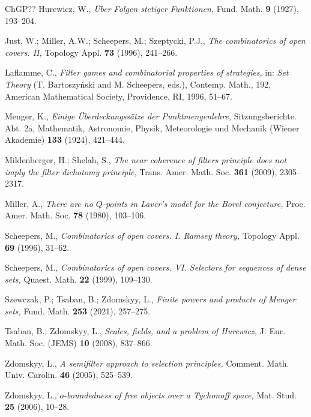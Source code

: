 \documentclass[12pt,a4paper]{amsart}
\theoremstyle{definition}
\begin{document}
\begin{thebibliography}{ChGP??}
 Hurewicz, W.,
{\it \"Uber Folgen stetiger Funktionen,} Fund.  Math. \textbf{9}  (1927), 193--204.

  Just, W.; Miller, A.W.; Scheepers, M.; Szeptycki, P.J.,
{\it The combinatorics of open covers. II,}  Topology Appl.
\textbf{73}  (1996),   241--266.

Laflamme, C., 
{\it Filter games and combinatorial properties of strategies,} 
in: \emph{Set Theory} 
(T. Bartoszy\'nski and M. Scheepers, eds.),
Contemp. Math., 192,
American Mathematical Society, Providence, RI, 1996, 51--67.




Menger, K., {\it Einige \"{U}berdeckungss\"{a}tze der Punktmengenlehre,} Sitzungsberichte. Abt. 2a, Mathematik, Astronomie, Physik, Meteorologie und
Mechanik (Wiener Akademie) \textbf{133} (1924), 421--444.

Mildenberger, H.; Shelah, S., {\it The near coherence of filters principle does not imply the filter dichotomy principle,} Trans. Amer. Math. Soc. {\bf 361} (2009),  2305--2317.

Miller, A., {\it There are no $Q$-points in Laver's model for the Borel conjecture,} Proc. Amer. Math. Soc. {\bf 78} (1980),  103--106.


  Scheepers, M., {\it Combinatorics of open covers. I. Ramsey theory,} Topology Appl. \textbf{69} (1996), 31--62.

 Scheepers, M., {\it Combinatorics of open covers. VI. Selectors for sequences of dense sets,} Quaest. Math. \textbf{22} (1999), 109--130.

 Szewczak, P.;  Tsaban, B.;  Zdomskyy, L.,
 {\it Finite powers and products of Menger sets,} Fund. Math. {\bf 253} (2021),  257--275.

 Tsaban, B.;  Zdomskyy, L., {\it Scales, fields, and a problem of Hurewicz,} J. Eur. Math. Soc. (JEMS) {\bf 10} (2008),  837--866.

 Zdomskyy, L.,  {\it A semifilter approach to selection principles,}
Comment. Math.  Univ.  Carolin. \textbf{46} (2005), 525--539.

Zdomskyy, L., {\it $o$-boundedness of free objects over a Tychonoff space,} Mat. Stud. {\bf 25} (2006),  10--28.

 


\end{thebibliography}
\end{document}
